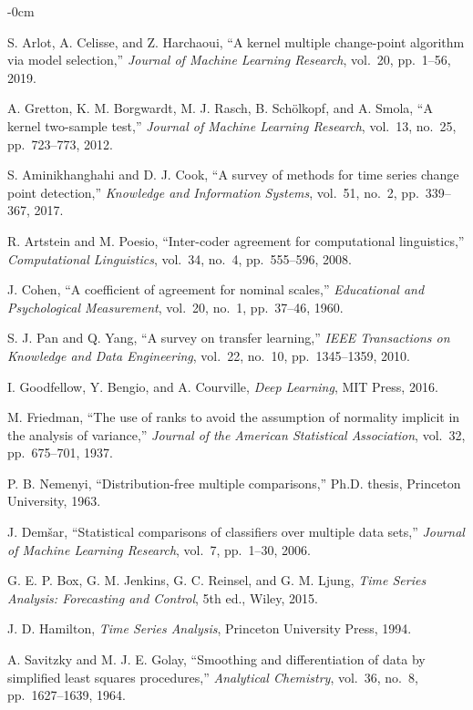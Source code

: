 \documentclass[journal,article,submit,pdftex,moreauthors]{Definitions/mdpi}
\begin{document}
\begin{adjustwidth}{-\extralength}{0cm}
\begin{thebibliography}{999}
S. Arlot, A. Celisse, and Z. Harchaoui, ``A kernel multiple change-point algorithm via model selection,'' \textit{Journal of Machine Learning Research}, vol.~20, pp.~1--56, 2019.

A. Gretton, K. M. Borgwardt, M. J. Rasch, B. Schölkopf, and A. Smola, ``A kernel two-sample test,'' \textit{Journal of Machine Learning Research}, vol.~13, no.~25, pp.~723--773, 2012.

S. Aminikhanghahi and D. J. Cook, ``A survey of methods for time series change point detection,'' \textit{Knowledge and Information Systems}, vol.~51, no.~2, pp.~339--367, 2017.

R. Artstein and M. Poesio, ``Inter-coder agreement for computational linguistics,'' \textit{Computational Linguistics}, vol.~34, no.~4, pp.~555--596, 2008.

J. Cohen, ``A coefficient of agreement for nominal scales,'' \textit{Educational and Psychological Measurement}, vol.~20, no.~1, pp.~37--46, 1960.

S. J. Pan and Q. Yang, ``A survey on transfer learning,'' \textit{IEEE Transactions on Knowledge and Data Engineering}, vol.~22, no.~10, pp.~1345--1359, 2010.

I. Goodfellow, Y. Bengio, and A. Courville, \textit{Deep Learning}, MIT Press, 2016.

M. Friedman, ``The use of ranks to avoid the assumption of normality implicit in the analysis of variance,'' \textit{Journal of the American Statistical Association}, vol.~32, pp.~675--701, 1937.

P. B. Nemenyi, ``Distribution-free multiple comparisons,'' Ph.D. thesis, Princeton University, 1963.

J. Demšar, ``Statistical comparisons of classifiers over multiple data sets,'' \textit{Journal of Machine Learning Research}, vol.~7, pp.~1--30, 2006.

G. E. P. Box, G. M. Jenkins, G. C. Reinsel, and G. M. Ljung, \textit{Time Series Analysis: Forecasting and Control}, 5th ed., Wiley, 2015.

J. D. Hamilton, \textit{Time Series Analysis}, Princeton University Press, 1994.

A. Savitzky and M. J. E. Golay, ``Smoothing and differentiation of data by simplified least squares procedures,'' \textit{Analytical Chemistry}, vol.~36, no.~8, pp.~1627--1639, 1964.


\end{thebibliography}
\end{adjustwidth}
\end{document}
